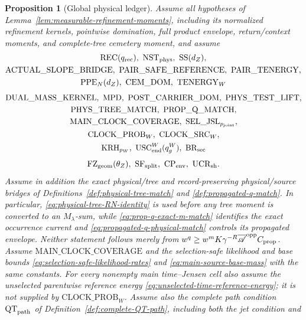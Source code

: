 \documentclass[11pt]{article}
\newtheorem{proposition}[theorem]{Proposition}
\begin{document}
\begin{proposition}[Global physical ledger]
\label{prop:global-labelled-ledger}
Assume all hypotheses of
Lemma~\ref{lem:measurable-refinement-moments}, including its normalized
refinement kernels, pointwise domination, full product envelope,
return/context moments, and complete-tree cemetery moment, and assume
\[
 \begin{gathered}
 \mathrm{REC}(q_{\rm rec}),\ \mathrm{NST}_{\rm phys},\ \mathrm{SS}(d_Z),\\
 \mathrm{ACTUAL\_SLOPE\_BRIDGE},\ \mathrm{PAIR\_SAFE\_REFERENCE},\
 \mathrm{PAIR\_TENERGY},\\
 \mathrm{PPE}_{N}(d_Z),\ \mathrm{CEM\_DOM},\ \mathrm{TENERGY}_{W}
 \end{gathered}
\]
\[
 \begin{gathered}
 \mathrm{DUAL\_MASS\_KERNEL},\ \mathrm{MPD},\
 \mathrm{POST\_CARRIER\_DOM},\ \mathrm{PHYS\_TEST\_LIFT},\\
 \mathrm{PHYS\_TREE\_MATCH},\ \mathrm{PROP\_Q\_MATCH},\\
 \mathrm{MAIN\_CLOCK\_COVERAGE},\
 \mathrm{SEL\_JSL}_{p_{\rm joint}},\\
 \mathrm{CLOCK\_PROB}_{W},\ \mathrm{CLOCK\_SRC}_{W},\\
 \mathrm{KRH}_{p_W},\ \mathrm{USC}_{\rm end}^{W}(q_g^W),\
 \mathrm{BR}_{\rm sec}
 \end{gathered}
\]
\[
 \mathrm{FZ}_{\rm geom}(\theta_Z),\ \mathrm{SF}_{\rm split},\
 \mathrm{CP}_{\rm env},\ \mathrm{UCR}_{\rm sh}.
\]
Assume in addition the exact physical/tree and record-preserving
physical/source bridges of
Definitions~\ref{def:physical-tree-match} and
\ref{def:propagated-q-match}.  In particular,
\eqref{eq:physical-tree-RN-identity} is used before any tree moment is
converted to an $M_\lambda$-sum, while
\eqref{eq:prop-q-exact-m-match} identifies the exact occurrence current and
\eqref{eq:propagated-q-physical-match} controls its propagated envelope.
Neither statement follows merely from
$w^q\ge w^mK\gamma^{-R}\overline{\mathscr A}^{\rm opp}C_{\rm prop}$.
Assume $\mathrm{MAIN\_CLOCK\_COVERAGE}$ and the selection-safe likelihood
and base bounds \eqref{eq:selection-safe-likelihood-rates} and
\eqref{eq:main-source-base-mass} with the same constants.  For every
nonempty main time--Jensen cell also assume the unselected parentwise
reference energy \eqref{eq:unselected-time-reference-energy}; it is not
supplied by $\mathrm{CLOCK\_PROB}_{W}$.
Assume also the complete path condition $\mathrm{QT}_{\rm path}$ of
Definition~\ref{def:complete-QT-path}, including both the jet condition and

\end{proposition}
\end{document}
